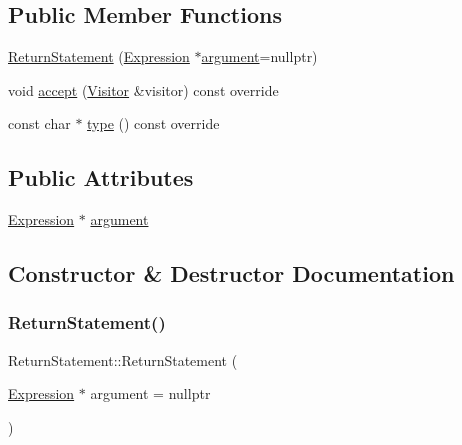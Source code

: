 \subsection*{Public Member Functions}
\begin{DoxyCompactItemize}
\item 
\hyperlink{struct_return_statement_ac2932e3a360cb4399de2f6235e64081a}{Return\+Statement} (\hyperlink{struct_expression}{Expression} $\ast$\hyperlink{struct_return_statement_aeead2cb2bcecfed685d54bb7ee5456f2}{argument}=nullptr)
\item 
void \hyperlink{struct_return_statement_af266bfb192300eeffc2d7454b019dd1a}{accept} (\hyperlink{struct_visitor}{Visitor} \&visitor) const override
\item 
const char $\ast$ \hyperlink{struct_return_statement_a4eff2224709e229d34fa4643f708a3a7}{type} () const override
\end{DoxyCompactItemize}
\subsection*{Public Attributes}
\begin{DoxyCompactItemize}
\item 
\hyperlink{struct_expression}{Expression} $\ast$ \hyperlink{struct_return_statement_aeead2cb2bcecfed685d54bb7ee5456f2}{argument}
\end{DoxyCompactItemize}


\subsection{Constructor \& Destructor Documentation}
\mbox{\label{struct_return_statement_ac2932e3a360cb4399de2f6235e64081a}} 
\subsubsection{\texorpdfstring{Return\+Statement()}{ReturnStatement()}}
{\footnotesize\ttfamily Return\+Statement\+::\+Return\+Statement (\begin{DoxyParamCaption}\item[{\hyperlink{struct_expression}{Expression} $\ast$}]{argument = {\ttfamily nullptr} }\end{DoxyParamCaption})\hspace{0.3cm}{\ttfamily [inline]}}



